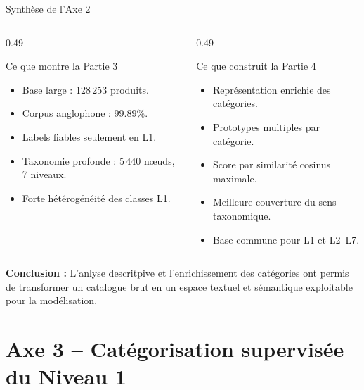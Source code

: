 \documentclass[11pt,aspectratio=169]{beamer}
\begin{document}
\begin{frame}{Synthèse de l'Axe 2}
\small
\begin{columns}
\begin{column}{0.49\textwidth}
\begin{block}{Ce que montre la Partie 3}
\begin{itemize}
    \item Base large : 128\,253 produits.
    \item Corpus anglophone : 99.89\%.
    \item Labels fiables seulement en L1.
    \item Taxonomie profonde : 5\,440 nœuds, 7 niveaux.
    \item Forte hétérogénéité des classes L1.
\end{itemize}
\end{block}
\end{column}

\begin{column}{0.49\textwidth}
\begin{block}{Ce que construit la Partie 4}
\begin{itemize}
    \item Représentation enrichie des catégories.
    \item Prototypes multiples par catégorie.
    \item Score par similarité cosinus maximale.
    \item Meilleure couverture du sens taxonomique.
    \item Base commune pour L1 et L2--L7.
\end{itemize}
\end{block}
\end{column}
\end{columns}

\vspace{0.30cm}

\begin{takeawaybox}
\centering
\textbf{Conclusion :} L'anlyse descritpive et l'enrichissement des catégories ont permis de transformer un catalogue brut en un espace textuel et sémantique exploitable pour la modélisation.
\end{takeawaybox}
\end{frame}

\section{Axe 3 -- Catégorisation supervisée du Niveau 1}
\end{document}
